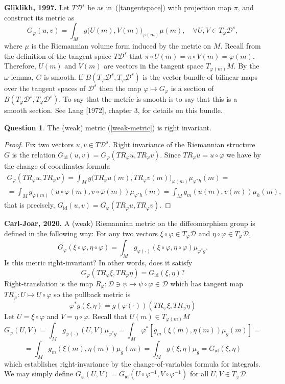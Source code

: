 \documentclass[a5paper,10pt,twoside]{article}
\newcommand{\cD}{\ensuremath{\mathcal{D}}}
\DeclareMathOperator*{\id}{id}
\theoremstyle{plain}
\theoremstyle{definition}
\newtheorem{question}{Question}
\theoremstyle{remark}
\begin{document}
\textbf{Gliklikh, 1997.} Let $T\cD^s$ be as in~(\ref{tangentspace}) with projection map $\pi$, and construct its metric as
%
\begin{equation}
\label{weak-metric}
G_\varphi(u,v)=\int_M g\big( U(m),V(m)\big)_{\varphi(m)}\mu(m),\quad \forall U,V\in T_\varphi\cD^s,
\end{equation}
%
where $\mu$ is the Riemannian volume form induced by the metric on $M$. Recall from the definition of the tangent space $T\cD^s$ that $\pi\circ U(m)=\pi\circ V(m)=\varphi(m)$. Therefore, $U(m)$ and $V(m)$ are vectors in the tangent space $T_{\varphi(m)}M$. By the $\omega$-lemma, $G$ is smooth.
If $B(T_\varphi\cD^s,T_\varphi\cD^s)$ is the vector bundle of bilinear maps over the tangent spaces of $\cD^s$ then the map $\varphi\mapsto G_\varphi$ is a section of $B(T_\varphi\cD^s,T_\varphi\cD^s)$. To say that the metric is smooth is to say that this is a smooth section. See Lang [1972], chapter 3, for details on this bundle.

\begin{question}
	The (weak) metric (\ref{weak-metric}) is right invariant.
\end{question}

\begin{proof}
	Fix two vectors $u,v\in T\cD^s$.
	Right invariance of the Riemannian structure $G$ is the relation $G_{\id}(u,v)=G_\varphi(TR_\varphi u,TR_\varphi v)$. Since $TR_\varphi u=u\circ\varphi$ we have by the change of coordinates formula
	\begin{multline}
	G_{\varphi}(TR_\varphi u,TR_\varphi v)=\int_M g\big( TR_\varphi u(m),TR_\varphi v(m)\big)_{\varphi(m)}\mu_{\varphi^*h}(m)=
	\\
	= \int_M g_{\varphi(m)}( u\circ\varphi(m),v\circ\varphi(m))\mu_{\varphi^*h}(m)
	= \int_M g_{m}( u(m),v(m))\mu_h(m),
	\end{multline}
	that is precisely, $G_{\id}(u,v)=G_\varphi(TR_\varphi u,TR_\varphi v)$.
\end{proof}

\textbf{Carl-Joar, 2020.} A (weak) Riemannian metric on the diffeomorphism group is defined in the following way: For any two vectors $\xi\circ\varphi\in T_{\varphi}\cD$
and $\eta\circ\varphi\in T_{\varphi}\cD$,
\[
G_{\varphi}(\xi\circ\varphi,\eta\circ\varphi)=\int_{M}g_{\varphi(\cdot)}(\xi\circ\varphi,\eta\circ\varphi)\mu_{\varphi^{*}g}.
\]
Is this metric right-invariant? In other words, does it satisfy
\[
G_{\varphi}(TR_\varphi\xi,TR_\varphi\eta)=G_{\id}(\xi,\eta)?
\]
Right-translation is the map $R_{\varphi}:\cD\ni\psi\mapsto\psi\circ\varphi\in \cD$
which has tangent map $TR_{\varphi}:U\mapsto U\circ\varphi$ so the
pullback metric is 
\[
\varphi^{*}g(\xi,\eta)=g(\varphi(\cdot))(TR_{\varphi}\xi,TR_{\varphi}\eta)
\]
Let $U=\xi\circ\varphi$ and $V=\eta\circ\varphi$. Recall that $U(m)\in T_{\varphi(m)}M$
\[
G_{\varphi}(U,V)=\int_{M}g_{\varphi(\cdot)}(U,V)\mu_{\varphi^{*}g}
=\int_{M}\varphi^{*}[g_{m}(\xi(m),\eta(m))\mu_{g}(m)]=
\]
\[
=\int_{M}g_{m}(\xi(m),\eta(m))\mu_{g}(m)=\int_M g(\xi,\eta)\mu_g=G_{\id}(\xi,\eta)
\]
%
which establishes right-invariance by the change-of-variables formula
for integrals. We may simply define $G_\varphi(U,V)=G_{\id}(U\circ\varphi^{-1},V\circ\varphi^{-1})$ for all $U,V\in T_\varphi\cD$.
\end{document}

